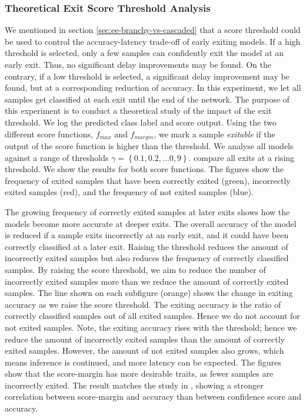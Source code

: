 \subsubsection{Theoretical Exit Score Threshold Analysis}

We mentioned in section \ref{sec:ee-branchy-vs-cascaded} that a score threshold could be used to control the accuracy-latency trade-off of early exiting models. If a high threshold is selected, only a few samples can confidently exit the model at an early exit. Thus, no significant delay improvements may be found. On the contrary, if a low threshold is selected, a significant delay improvement may be found, but at a corresponding reduction of accuracy. 
In this experiment, we let all samples get classified at each exit until the end of the network. The purpose of this experiment is to conduct a theoretical study of the impact of the exit threshold. We log the predicted class label and score output. Using the two different score functions, $ f_{max} $ and $ f_{margin} $, we mark a sample \emph{exitable} if the output of the score function is higher than the threshold. We analyse all models against a range of thresholds $ \gamma = \left\{0.1, 0.2, \dots 0,9\right\} $.
 compare all exits at a rising threshold. We show the results for both score functions.
The figures show the frequency of exited samples that have been correctly exited ({\color{sns-green}green}), incorrectly exited samples ({\color{sns-red}red}), and the frequency of not exited samples ({\color{sns-blue}blue}). 

The growing frequency of correctly exited samples at later exits shows how the models become more accurate at deeper exits. The overall accuracy of the model is reduced if a sample exits incorrectly at an early exit, and it could have been correctly classified at a later exit. Raising the threshold reduces the amount of incorrectly exited samples but also reduces the frequency of correctly classified samples. 
By raising the score threshold, we aim to reduce the number of incorrectly exited samples more than we reduce the amount of correctly exited samples. The line shown on each subfigure ({\color{sns-orange}orange}) shows the change in exiting accuracy as we raise the score threshold. The exiting accuracy is the ratio of correctly classified samples out of all exited samples. Hence we do not account for not exited samples. 
Note, the exiting accuracy rises with the threshold; hence we reduce the amount of incorrectly exited samples than the amount of correctly exited samples. However, the amount of not exited samples also grows, which means inference is continued, and more latency can be expected.
The figures show that the score-margin has more desirable traits, as fewer samples are incorrectly exited. The result matches the study in \cite{park_big/little_2015,tann_flexible_2018}, showing a stronger correlation between score-margin and accuracy than between confidence score and accuracy. 

